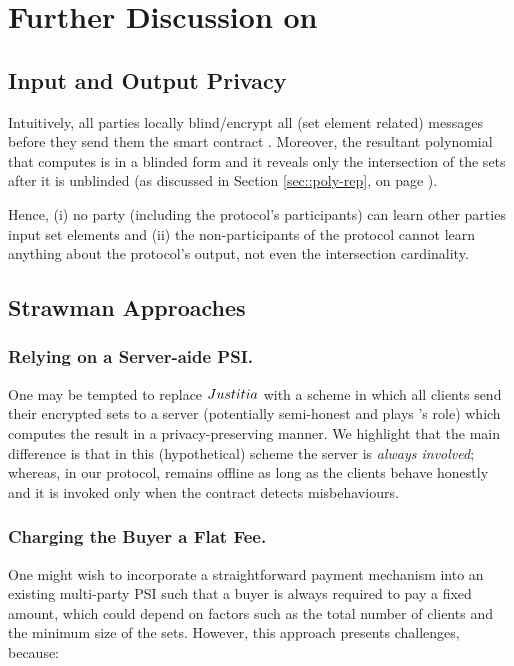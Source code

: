 

\section{Further Discussion on  \withFai}\label{sec::Discussion-justitia}


\subsection{Input and Output Privacy}

Intuitively, all parties locally blind/encrypt all (set element related) messages before they send them the smart contract \scf. Moreover, the resultant polynomial that \scf computes is in a blinded form and it reveals only the intersection of the sets after it is unblinded (as discussed in Section \ref{sec::poly-rep}, on page \pageref{sec::poly-rep}).


Hence, (i) no party (including the protocol's participants) can learn other parties input set elements and (ii) the non-participants of the protocol cannot learn anything about the protocol's output, not even the intersection cardinality. 


\subsection{Strawman Approaches}


\subsubsection{Relying on a Server-aide PSI.} One may be tempted to replace ${Justitia}$ with a scheme in which all clients send their encrypted sets to a server (potentially semi-honest and plays \aud's role) which computes the result in a privacy-preserving manner.  We highlight that the main difference is that in this (hypothetical) scheme the server is \emph{always involved};  whereas, in our protocol, \aud remains offline as long as the clients behave honestly and it is invoked only when the contract detects misbehaviours.  


\subsubsection{Charging the Buyer a Flat Fee.}

One might wish to incorporate a straightforward payment mechanism into an existing multi-party PSI such that a buyer is always required to pay a fixed amount, which could depend on factors such as the total number of clients and the minimum size of the sets. However, this approach presents challenges, because:

